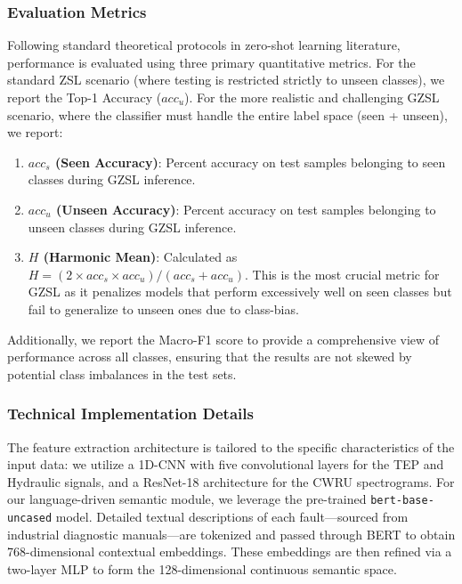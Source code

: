 \documentclass[journal]{IEEEtran}
\begin{document}
\subsubsection{Evaluation Metrics}
Following standard theoretical protocols in zero-shot learning literature, performance is evaluated using three primary quantitative metrics. For the standard ZSL scenario (where testing is restricted strictly to unseen classes), we report the Top-1 Accuracy ($acc_u$). For the more realistic and challenging GZSL scenario, where the classifier must handle the entire label space (seen + unseen), we report:
\begin{enumerate}
    \item \textbf{$acc_s$ (Seen Accuracy)}: Percent accuracy on test samples belonging to seen classes during GZSL inference.
    \item \textbf{$acc_u$ (Unseen Accuracy)}: Percent accuracy on test samples belonging to unseen classes during GZSL inference.
    \item \textbf{$H$ (Harmonic Mean)}: Calculated as $H = (2 \times acc_s \times acc_u) / (acc_s + acc_u)$. This is the most crucial metric for GZSL as it penalizes models that perform excessively well on seen classes but fail to generalize to unseen ones due to class-bias.
\end{enumerate}
Additionally, we report the Macro-F1 score to provide a comprehensive view of performance across all classes, ensuring that the results are not skewed by potential class imbalances in the test sets.

\subsubsection{Technical Implementation Details}
The feature extraction architecture is tailored to the specific characteristics of the input data: we utilize a 1D-CNN with five convolutional layers for the TEP and Hydraulic signals, and a ResNet-18 architecture for the CWRU spectrograms. For our language-driven semantic module, we leverage the pre-trained \texttt{bert-base-uncased} model. Detailed textual descriptions of each fault—sourced from industrial diagnostic manuals—are tokenized and passed through BERT to obtain 768-dimensional contextual embeddings. These embeddings are then refined via a two-layer MLP to form the 128-dimensional continuous semantic space.
\end{document}
